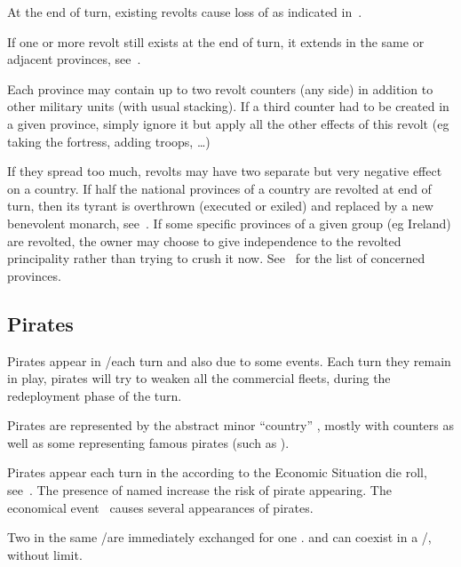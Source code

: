  At the end of turn, existing revolts cause loss of
\STAB as indicated in~.

 If one or more revolt still exists at the end of
turn, it extends in the same or adjacent provinces,
see~.

 Each province may contain up to two revolt counters
(any side) in addition to other military units (with usual stacking).
\bparag If a third counter had to be created in a given province, simply
ignore it but apply all the other effects of this revolt (eg taking the
fortress, adding troops, \ldots)

 If they spread too much, revolts may have two
separate but very negative effect on a country.
\bparag If half the national provinces of a country are revolted at end of
turn, then its tyrant is overthrown (executed or exiled) and replaced by a new
benevolent monarch, see~.
\bparag If some specific provinces of a given group (eg Ireland) are revolted,
the owner may choose to give independence to the revolted principality rather
than trying to crush it now. See~ for the list of concerned provinces.



\subsection{Pirates}

Pirates appear in \STZ/\CTZ each turn and also due to some events. Each turn
they remain in play, pirates will try to weaken all the commercial fleets,
during the redeployment phase of the turn.

Pirates are represented by the abstract minor ``country'' ,
mostly with \corsaire counters as well as some \LeaderA representing famous
pirates (such as \leaderBlackbeard).

 Pirates appear each turn in the \ROTW \STZ
according to the Economic Situation die roll, see~.
\bparag The presence of named  \LeaderA increase the risk of
pirate appearing.
\bparag The economical event~ causes several appearances
of pirates.

 Two  \corsaire\facemoins in the
same \STZ/\CTZ are immediately exchanged for one 
\corsaire\faceplus.  \corsaire\faceplus and \Facemoins can
coexist in a \STZ/\CTZ, without limit.

